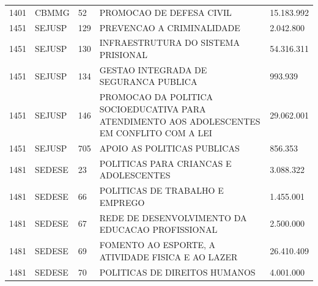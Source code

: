 \documentclass{article}
\begin{document}
\begin{longtable}[c]{m{1cm}|m{1.5cm}|m{1cm}m{10cm}|m{2cm}}
\multicolumn{1}{C{1cm}|}{1401} & \multicolumn{1}{L{1.5cm}|}{CBMMG} & \multicolumn{1}{C{1cm}|}{52} & \multicolumn{1}{L{10cm}|}{PROMOCAO DE DEFESA CIVIL} & \multicolumn{1}{R{2cm}}{15.183.992} \\
\multicolumn{1}{C{1cm}|}{1451} & \multicolumn{1}{L{1.5cm}|}{SEJUSP} & \multicolumn{1}{C{1cm}|}{129} & \multicolumn{1}{L{10cm}|}{PREVENCAO A CRIMINALIDADE} & \multicolumn{1}{R{2cm}}{2.042.800} \\
\multicolumn{1}{C{1cm}|}{1451} & \multicolumn{1}{L{1.5cm}|}{SEJUSP} & \multicolumn{1}{C{1cm}|}{130} & \multicolumn{1}{L{10cm}|}{INFRAESTRUTURA DO SISTEMA PRISIONAL} & \multicolumn{1}{R{2cm}}{54.316.311} \\
\multicolumn{1}{C{1cm}|}{1451} & \multicolumn{1}{L{1.5cm}|}{SEJUSP} & \multicolumn{1}{C{1cm}|}{134} & \multicolumn{1}{L{10cm}|}{GESTAO INTEGRADA DE SEGURANCA PUBLICA} & \multicolumn{1}{R{2cm}}{993.939} \\
\multicolumn{1}{C{1cm}|}{1451} & \multicolumn{1}{L{1.5cm}|}{SEJUSP} & \multicolumn{1}{C{1cm}|}{146} & \multicolumn{1}{L{10cm}|}{PROMOCAO DA POLITICA SOCIOEDUCATIVA PARA ATENDIMENTO AOS ADOLESCENTES EM CONFLITO COM A LEI} & \multicolumn{1}{R{2cm}}{29.062.001} \\
\multicolumn{1}{C{1cm}|}{1451} & \multicolumn{1}{L{1.5cm}|}{SEJUSP} & \multicolumn{1}{C{1cm}|}{705} & \multicolumn{1}{L{10cm}|}{APOIO AS POLITICAS PUBLICAS} & \multicolumn{1}{R{2cm}}{856.353} \\
\multicolumn{1}{C{1cm}|}{1481} & \multicolumn{1}{L{1.5cm}|}{SEDESE} & \multicolumn{1}{C{1cm}|}{23} & \multicolumn{1}{L{10cm}|}{POLITICAS PARA CRIANCAS E ADOLESCENTES} & \multicolumn{1}{R{2cm}}{3.088.322} \\
\multicolumn{1}{C{1cm}|}{1481} & \multicolumn{1}{L{1.5cm}|}{SEDESE} & \multicolumn{1}{C{1cm}|}{66} & \multicolumn{1}{L{10cm}|}{POLITICAS DE TRABALHO E EMPREGO} & \multicolumn{1}{R{2cm}}{1.455.001} \\
\multicolumn{1}{C{1cm}|}{1481} & \multicolumn{1}{L{1.5cm}|}{SEDESE} & \multicolumn{1}{C{1cm}|}{67} & \multicolumn{1}{L{10cm}|}{REDE DE DESENVOLVIMENTO DA EDUCACAO PROFISSIONAL} & \multicolumn{1}{R{2cm}}{2.500.000} \\
\multicolumn{1}{C{1cm}|}{1481} & \multicolumn{1}{L{1.5cm}|}{SEDESE} & \multicolumn{1}{C{1cm}|}{69} & \multicolumn{1}{L{10cm}|}{FOMENTO AO ESPORTE, A ATIVIDADE FISICA E AO LAZER} & \multicolumn{1}{R{2cm}}{26.410.409} \\
\multicolumn{1}{C{1cm}|}{1481} & \multicolumn{1}{L{1.5cm}|}{SEDESE} & \multicolumn{1}{C{1cm}|}{70} & \multicolumn{1}{L{10cm}|}{POLITICAS DE DIREITOS HUMANOS} & \multicolumn{1}{R{2cm}}{4.001.000} \\

\end{longtable}
\end{document}
